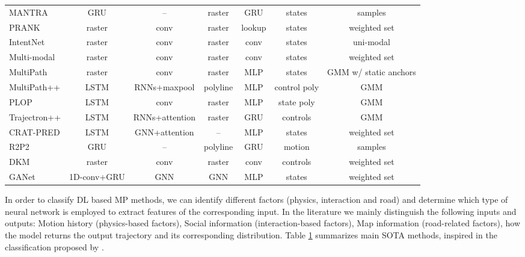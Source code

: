 \begin{table}[h!]
\begin{adjustbox}{max width=\textwidth}
\begin{tabular}{l |ccc|c|c|c}
			MANTRA \cite{marchetti2020mantra}	& GRU	& --	& raster	& GRU	& states	& samples	\\
			PRANK \cite{biktairov2020prank}	& raster	& conv	& raster	& lookup	& states	& weighted set	\\
			IntentNet \cite{casas2018intentnet}	& raster	& conv	& raster	& conv	& states	& uni-modal	\\
			Multi-modal \cite{cui2019multimodal}	& raster	& conv	& raster	& conv	& states	& weighted set	\\
			MultiPath \cite{chai2019multipath}	& raster	& conv	& raster	& MLP	& states	& GMM w/ static anchors	\\
			MultiPath++ \cite{varadarajan2022multipath++}	& LSTM	& RNNs+maxpool	& polyline	& MLP	& control poly	& GMM	\\
			PLOP \cite{buhet2021plop}	& LSTM	& conv	& raster	& MLP	& state poly	& GMM	\\
			Trajectron++ \cite{salzmann2020trajectron++}	& LSTM	& RNNs+attention	& raster	& GRU	& controls	& GMM	\\
			CRAT-PRED \cite{schmidt2022crat}	& LSTM	& GNN+attention	& --	& MLP	& states	& weighted set	\\
			R2P2 \cite{rhinehart2018r2p2}	& GRU	& --	& polyline	& GRU	& motion	& samples	\\
			DKM \cite{cui2020deep}	& raster	& conv	& raster	& conv	& controls	& weighted set	\\
			GANet \cite{wang2022ganet}	& 1D-conv+GRU	& GNN	& GNN	& MLP	& states	& weighted set	\\
			\bottomrule
		\end{tabular}
		\label{table:2_dl_related_work_mp}
	\end{adjustbox}
\end{table}

In order to classify \ac{DL} based \ac{MP} methods, we can identify different factors (physics, interaction and road) and determine which type of neural network is employed to extract features of the corresponding input. In the literature we mainly distinguish the following inputs and outputs: Motion history (physics-based factors), Social information (interaction-based factors), Map information (road-related factors), how the model returns the output trajectory and its corresponding distribution. Table \ref{table:2_dl_related_work_mp} summarizes main \ac{SOTA} methods, inspired in the classification proposed by \cite{varadarajan2022multipath++}. 

